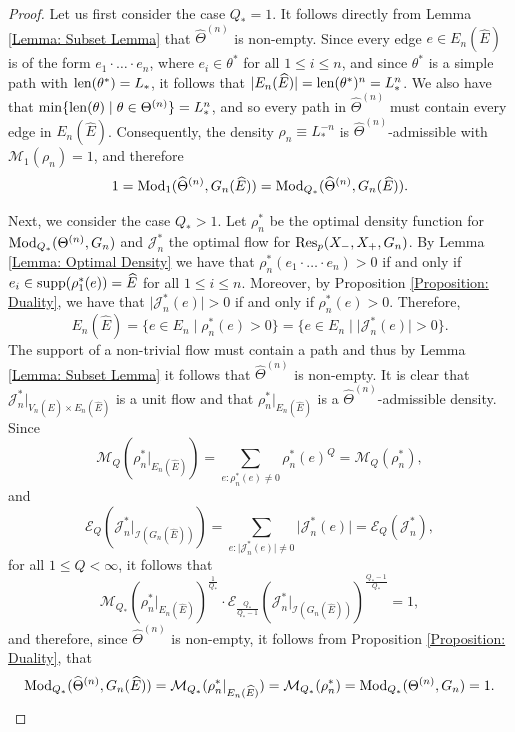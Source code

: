 \documentclass{amsart}
\newcommand{\len}{{\rm len}}
\newcommand{\Mod}{{\rm Mod}}
\newcommand{\Res}{{\rm Res}}
\newcommand{\supp}{{\rm supp}}
\numberwithin{equation}{section}
\theoremstyle{definition}
\theoremstyle{remark}
\newcommand{\cE}{\mathcal{E}}
\newcommand{\cJ}{\mathcal{J}}
\newcommand{\cI}{\mathcal{I}}
\newcommand{\cM}{\mathcal{M}}
\begin{document}
\begin{proof}
    Let us first consider the case \(Q_*=1\). It follows directly from Lemma \ref{Lemma: Subset Lemma} that \(\widehat{\Theta}^{(n)}\) is non-empty. Since every edge \(e\in E_n(\widehat{E})\) is of the form \(e_1\cdot \ldots\cdot e_n\), where \(e_i\in \theta^*\) for all \(1\leq i\leq n\), and since \(\theta^*\) is a simple path with \(\len(\theta^*)=L_*\), it follows that \(\lvert E_n(\widehat{E})\rvert = \len(\theta^*)^n= L_*^n\). We also have that \(\min\{\len(\theta)\mid\theta\in\Theta^{(n)}\}=L_*^n\), and so every path in \(\widehat{\Theta}^{(n)}\) must contain every edge in \(E_n(\widehat{E})\). Consequently, the density \(\rho_n\equiv L_*^{-n}\) is \(\widehat{\Theta}^{(n)}\)-admissible with \(\cM_1(\rho_n)=1\), and therefore 
        \[
            1=\Mod_1(\widehat{\Theta}^{(n)},G_n(\widehat{E}))=\Mod_{Q_*}(\widehat{\Theta}^{(n)},G_n(\widehat{E})).
        \]
    
    
    Next, we consider the case \(Q_*>1\). Let $\rho^*_n$ be the optimal density function for $\Mod_{Q_*}(\Theta^{(n)}, G_n)$ and $\cJ^*_n$ the optimal flow for $\Res_p(X_-,X_+,G_n)$. By Lemma \ref{Lemma: Optimal Density} we have that \(\rho^*_n(e_1\cdot\ldots\cdot e_n)>0\) if and only if \(e_i\in \supp(\rho^*_1(e))=\widehat{E}\) for all \(1\leq i\leq n\). Moreover, by Proposition \ref{Proposition: Duality}, we have that \(\lvert \cJ^*_n(e)\rvert >0\) if and only if \(\rho^*_n(e)>0\). Therefore,
        \[
            E_n(\widehat{E})=\{e\in E_n\mid \rho^*_n(e)>0\}=\{e\in E_n\mid \lvert\cJ^*_n(e)\rvert>0\}.
        \]
     The support of a non-trivial flow must contain a path and thus by Lemma \ref{Lemma: Subset Lemma} it follows that \(\widehat{\Theta}^{(n)}\) is non-empty.  It is clear that \(\cJ^*_n\vert_{V_n(\widehat{E}) \times E_n(\widehat{E})}\) is a unit flow and that \(\rho^*_n\vert_{E_n(\widehat{E})}\) is a \(\widehat{\Theta}^{(n)}\)-admissible density. Since
        \[
            \cM_{Q}(\rho^*_n\vert_{E_n(\widehat{E})})=\sum_{e:\rho^*_n(e)\neq 0}\rho^*_n(e)^{Q}=\cM_{Q}(\rho^*_n),
        \]
    and
        \[
            \cE_{Q}(\cJ^*_n\vert_{\cI(G_n(\widehat{E}))})=\sum_{e:\lvert \cJ^*_n(e)\rvert\neq0}\lvert\cJ^*_n(e)\rvert=\cE_{Q}(\cJ^*_n),
        \]
    for all \(1\leq Q<\infty\), it follows that
        \[
            \cM_{Q_*}(\rho^*_n\vert_{E_n(\widehat{E})})^{\frac{1}{Q_*}}\cdot\cE_{\frac{Q_*}{Q_*-1}}(\cJ^*_n\vert_{\cI(G_n(\widehat{E}))})^{\frac{Q_*-1}{Q_*}}=1,
        \]
    and therefore, since \(\widehat{\Theta}^{(n)}\) is non-empty, it follows from Proposition \ref{Proposition: Duality}, that 
        \[
            \Mod_{Q_*}(\widehat{\Theta}^{(n)},G_n(\widehat{E}))= \cM_{Q_*}(\rho^*_n\vert_{E_n(\widehat{E})})=\cM_{Q_*}(\rho^*_n)=\Mod_{Q_*}(\Theta^{(n)},G_n)=1.
        \]
    
\end{proof}
\end{document}
